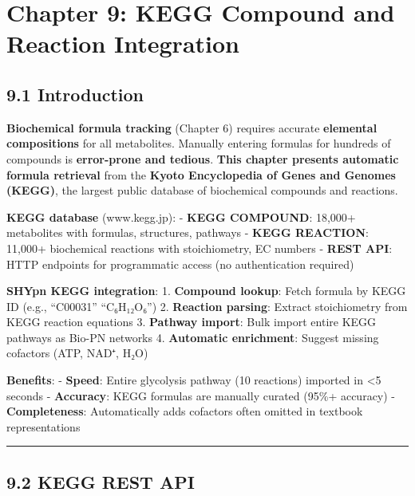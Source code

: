 \hypertarget{chapter-9-kegg-compound-and-reaction-integration}{%
\chapter{Chapter 9: KEGG Compound and Reaction
Integration}\label{chapter-9-kegg-compound-and-reaction-integration}}

\hypertarget{introduction}{%
\section{9.1 Introduction}\label{introduction}}

\textbf{Biochemical formula tracking} (Chapter 6) requires accurate
\textbf{elemental compositions} for all metabolites. Manually entering
formulas for hundreds of compounds is \textbf{error-prone and tedious}.
\textbf{This chapter presents automatic formula retrieval} from the
\textbf{Kyoto Encyclopedia of Genes and Genomes (KEGG)}, the largest
public database of biochemical compounds and reactions.

\textbf{KEGG database} (www.kegg.jp): - \textbf{KEGG COMPOUND}: 18,000+
metabolites with formulas, structures, pathways - \textbf{KEGG
REACTION}: 11,000+ biochemical reactions with stoichiometry, EC numbers
- \textbf{REST API}: HTTP endpoints for programmatic access (no
authentication required)

\textbf{SHYpn KEGG integration}: 1. \textbf{Compound lookup}: Fetch
formula by KEGG ID (e.g., ``C00031'' \textrightarrow ``C₆H₁₂O₆'') 2. \textbf{Reaction
parsing}: Extract stoichiometry from KEGG reaction equations 3.
\textbf{Pathway import}: Bulk import entire KEGG pathways as Bio-PN
networks 4. \textbf{Automatic enrichment}: Suggest missing cofactors
(ATP, NAD⁺, H₂O)

\textbf{Benefits}: - \textbf{Speed}: Entire glycolysis pathway (10
reactions) imported in \textless5 seconds - \textbf{Accuracy}: KEGG
formulas are manually curated (95\%+ accuracy) - \textbf{Completeness}:
Automatically adds cofactors often omitted in textbook representations

\begin{center}\rule{0.5\linewidth}{0.5pt}\end{center}

\hypertarget{kegg-rest-api}{%
\section{9.2 KEGG REST API}\label{kegg-rest-api}}

